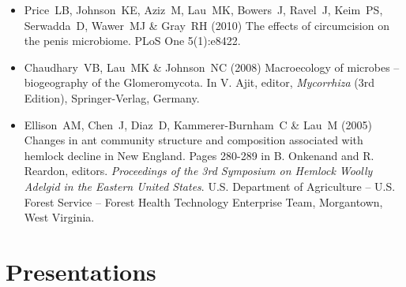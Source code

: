\documentclass[a4paper]{article}
\begin{document}
\begin{itemize}
\item
  Price~LB, Johnson~KE, Aziz~M, Lau~MK, Bowers~J, Ravel~J, Keim~PS,
  Serwadda~D, Wawer~MJ \& Gray~RH (2010) The effects of circumcision on
  the penis microbiome. PLoS One 5(1):e8422.
\item
  Chaudhary~VB, Lau~MK \& Johnson~NC (2008) Macroecology of microbes --
  biogeography of the Glomeromycota. In V. Ajit, editor,
  \emph{Mycorrhiza} (3rd Edition), Springer-Verlag, Germany.
\item
  Ellison~AM, Chen~J, Diaz~D, Kammerer-Burnham~C \& Lau~M (2005) Changes
  in ant community structure and composition associated with hemlock
  decline in New England. Pages 280-289 in B. Onkenand and R. Reardon,
  editors. \emph{Proceedings of the 3rd Symposium on Hemlock Woolly
  Adelgid in the Eastern United States}. U.S. Department of Agriculture
  -- U.S. Forest Service -- Forest Health Technology Enterprise Team,
  Morgantown, West Virginia.
\end{itemize}

\section{Presentations}\label{presentations}
\end{document}
